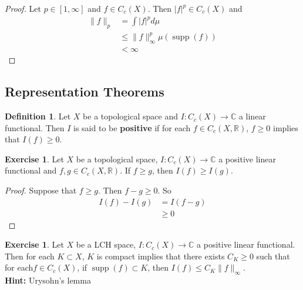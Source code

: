 \documentclass[12pt]{amsart}
\theoremstyle{definition}
\newtheorem{defn}[definition]{Definition}
\newtheorem{ex}[definition]{Exercise}
\newcommand{\C}{\mathbb{C}}
\newcommand{\R}{\mathbb{R}}
\DeclareMathOperator{\supp}{supp}
\newcommand{\lex}[1]{\label{ex:#1}}
\newcommand{\ld}[1]{\label{defn:#1}}
\begin{document}
	\begin{proof}
	Let $p \in [1, \infty]$ and $f \in C_c(X)$. Then $|f|^p \in C_c(X)$ and 
	\begin{align*}
	\|f\|_p 
	&= \int |f|^p d\mu \\
	& \leq \|f\|_{\infty}^p \mu(\supp (f)) \\
	& < \infty
\end{align*}	 
	\end{proof}
	
	
	
	
	
	
	
	
	
	
	
	
	\newpage	
	\subsection{Representation Theorems}
	
	\begin{defn} \ld{00000} 
	Let $X$ be a topological space and $I: C_c(X) \rightarrow \C$ a linear functional. Then $I$ is said to be \textbf{positive} if for each $f \in C_c(X, \R)$, $f \geq 0 $ implies that $I(f) \geq 0$.
	\end{defn}
	
	\begin{ex} \lex{00000} 
	Let $X$ be a topological space, $I: C_c(X) \rightarrow \C$ a positive linear functional and $f,g \in C_c(X, \R)$. If $f \geq g$, then $I(f) \geq I (g)$.  
	\end{ex}	
	
	\begin{proof}
	Suppose that $f \geq g$. Then $f - g \geq 0$. So 
	\begin{align*}
	I(f) - I(g) 
	&= I(f -g) \\
	&\geq 0
	\end{align*}
	\end{proof}
	
	
	
	\begin{ex} \lex{00000} 
	Let $X$ be a LCH space, $I: C_c(X) \rightarrow \C$ a positive linear functional. Then for each $K \subset X$, $K $ is compact implies that there exists $C_K \geq 0$ such that for each$f \in C_c(X)$, if $\supp(f) \subset K$, then $I(f) \leq C_K \|f\|_{\infty}$.\\
	\textbf{Hint:} Urysohn's lemma 
	\end{ex}
	
\end{document}

